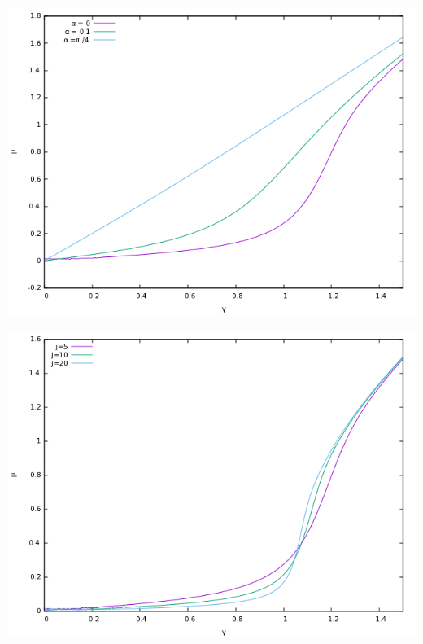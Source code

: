 \begin{center}
  \begin{minipage}[t]{.45\textwidth}
    \includegraphics[width=1\linewidth]{pictures/Phasetransition_shift.png}
  \end{minipage}
\hfill
  \begin{minipage}[t]{.45\textwidth}
    \includegraphics[width=1\linewidth]{pictures/Phasetransition_j.png}
  \end{minipage}
\end{center}